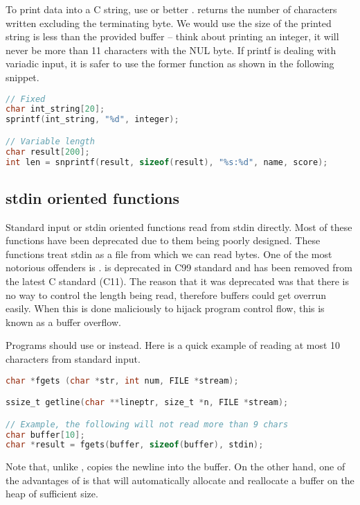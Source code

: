 To print data into a C string, use  or better .
 returns the number of characters written excluding the terminating byte.
We would use  the size of the printed string is less than the provided buffer -- think about printing an integer, it will never be more than 11 characters with the NUL byte.
If printf is dealing with variadic input, it is safer to use the former function as shown in the following snippet.

\begin{lstlisting}[language=C]
// Fixed
char int_string[20];
sprintf(int_string, "%d", integer);

// Variable length
char result[200];
int len = snprintf(result, sizeof(result), "%s:%d", name, score);
\end{lstlisting}

\subsection{stdin oriented functions}

Standard input or stdin oriented functions read from stdin directly.
Most of these functions have been deprecated due to them being poorly designed. These functions treat stdin as a file from which we can read bytes.
One of the most notorious offenders is .
 is deprecated in C99 standard and has been removed from the latest C standard (C11).
The reason that it was deprecated was that there is no way to control the length being read, therefore buffers could get overrun easily.
When this is done maliciously to hijack program control flow, this is known as a buffer overflow.

Programs should use  or  instead.
Here is a quick example of reading at most 10 characters from standard input.

\begin{lstlisting}[language=C]
char *fgets (char *str, int num, FILE *stream);

ssize_t getline(char **lineptr, size_t *n, FILE *stream);

// Example, the following will not read more than 9 chars
char buffer[10];
char *result = fgets(buffer, sizeof(buffer), stdin);
\end{lstlisting}

Note that, unlike ,  copies the newline into the buffer.
On the other hand, one of the advantages of  is that will automatically allocate and reallocate a buffer on the heap of sufficient size.

